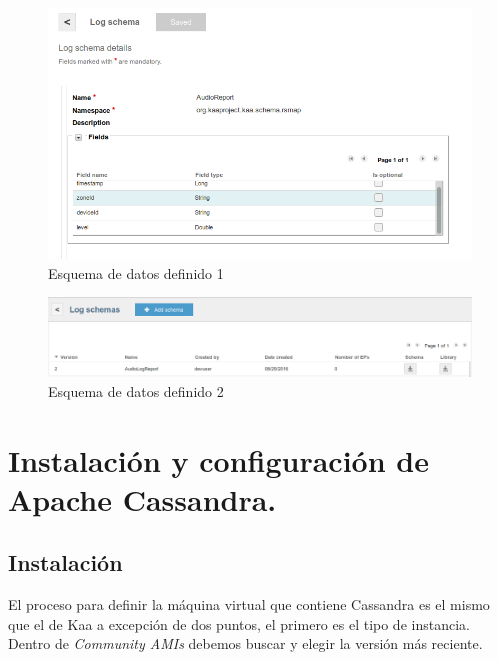 \begin{figure}[!ht]
  \begin{center}
    \includegraphics[scale=0.45]{../images/kaa/13.png}
		\caption{Esquema de datos definido 1}
    \label{fig:kaa}
	\end{center}
\end{figure}

\begin{figure}[!ht]
  \begin{center}
    \includegraphics[scale=0.30]{../images/kaa/14.png}
		\caption{Esquema de datos definido 2}
    \label{fig:kaa}
	\end{center}
\end{figure}

\newpage

\newpage
\newpage
\newpage

\section{Instalación y configuración de Apache Cassandra.}

\subsection{Instalación}

El proceso para definir la máquina virtual que contiene Cassandra es el mismo que el de Kaa a excepción de dos puntos, el primero es el tipo de instancia. Dentro de \textit{Community AMIs} debemos buscar  y elegir la versión más reciente.

